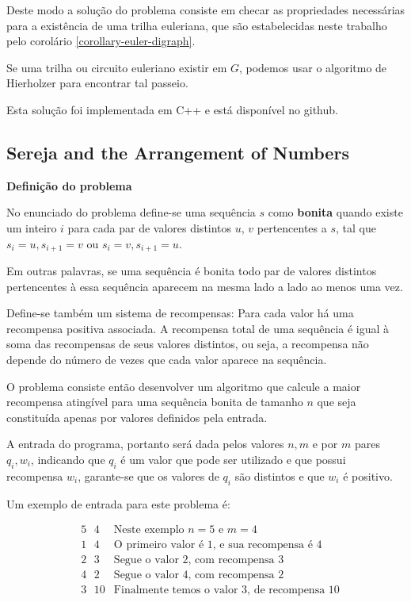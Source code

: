 \documentclass[12pt, a4paper]{article}
\begin{document}
        Deste modo a solução do problema consiste em checar as propriedades necessárias para a existência de uma trilha euleriana, que são estabelecidas neste trabalho pelo corolário \ref{corollary-euler-digraph}.

        Se uma trilha ou circuito euleriano existir em $G$, podemos usar o algoritmo de Hierholzer para encontrar tal passeio.

        Esta solução foi implementada em C++ e está disponível no github\cite{tanya-sol}.

        \subsection{Sereja and the Arrangement of Numbers\cite{sereja}}

        \textbf{Definição do problema}

        No enunciado do problema define-se uma sequência $s$ como \textbf{bonita} quando existe um inteiro $i$ para cada par de valores distintos $u$, $v$ pertencentes a $s$, tal que $s_i = u, s_{i+1} = v$ ou $s_i = v, s_{i+1} = u$.

        Em outras palavras, se uma sequência é bonita todo par de valores distintos pertencentes à essa sequência aparecem na mesma lado a lado ao menos uma vez.

        Define-se também um sistema de recompensas:
        Para cada valor há uma recompensa positiva associada.
        A recompensa total de uma sequência é igual à soma das recompensas de seus valores distintos, ou seja, a recompensa não depende do número de vezes que cada valor aparece na sequência.

        O problema consiste então desenvolver um algoritmo que calcule a maior recompensa atingível para uma sequência bonita de tamanho $n$ que seja constituída apenas por valores definidos pela entrada. 

        A entrada do programa, portanto será dada pelos valores $n, m$ e por $m$ pares $q_i, w_i$, indicando que $q_i$ é um valor que pode ser utilizado e que possui recompensa $w_i$, garante-se que os valores de $q_i$ são distintos e que $w_i$ é positivo.

        Um exemplo de entrada para este problema é:

        \begin{align*}
            & 5 \text{ }4 & \text{Neste exemplo $n = 5$ e $m = 4$}\\
            & 1 \text{ }4 & \text{O primeiro valor é 1, e sua recompensa é 4}\\
            & 2 \text{ }3 & \text{Segue o valor 2, com recompensa 3}\\
            & 4 \text{ }2 & \text{Segue o valor 4, com recompensa 2}\\
            & 3 \text{ }10 &\text{Finalmente temos o valor 3, de recompensa 10}\\
        \end{align*}
\end{document}
